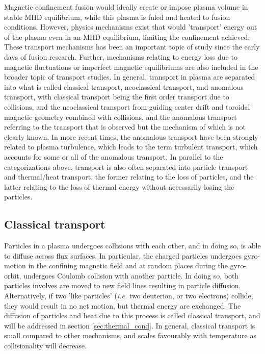 \begin{refsection}
Magnetic confinement fusion would ideally create or impose plasma volume in stable MHD equilibrium, while this plasma is fuled and heated to fusion conditions. However, physics mechanisms exist that would 'transport' energy out of the plasma even in an MHD equilibrium, limiting the confinement achieved. These transport mechanisms has been an important topic of study since the early days of fusion research.  Further, mechanisms relating to energy loss due to magnetic fluctuations or imperfect magnetic equilibriums are also included in the broader topic of transport studies. In general, transport in plasma are separated into what is called classical transport, neoclassical transport, and anomalous transport, with classical transport being the first order transport due to collisions, and the neoclassical transport from guiding center drift and toroidal magnetic geometry combined with collisions, and the anomalous transport referring to the transport that is observed but the mechanism of which is not clearly known. In more recent times, the anomalous transport have been strongly related to plasma turbulence, which leads to the term turbulent transport, which accounts for some or all of the anomalous transport. In parallel to the categorizations above, transport is also often separated into particle transport and thermal/heat transport, the former relating to the loss of particles, and the latter relating to the loss of thermal energy without necessarily losing the particles.

\subsection{Classical transport}

Particles in a plasma undergoes collisions with each other, and in doing so, is able to diffuse across flux surfaces. In particular, the charged particles undergoes gyro-motion in the confining magnetic field and at random places during the gyro-orbit, undergoes Coulomb collision with another particle. In doing so, both particles involves are moved to new field lines resulting in particle diffusion. Alternatively, if two 'like particles' (\textit{i.e.} two deuterion, or two electrons) collide, they would result in no net motion, but thermal energy are exchanged. The diffusion of particles and heat due to this process is called classical transport, and will be addressed in section \ref{sec:thermal_cond}. In general, classical transport is small compared to other mechanisms, and scales favourably with temperature as collisionality will decrease.


\end{refsection}
